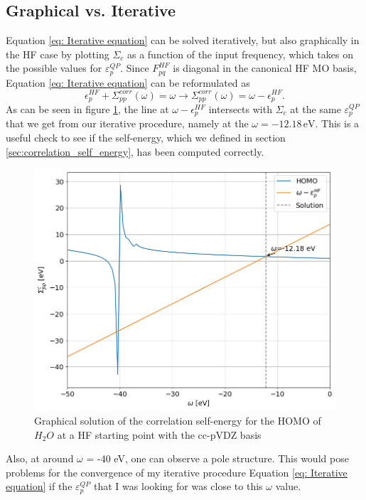 \documentclass[12pt]{caltech_thesis}
\begin{document}
\subsection{Graphical vs. Iterative}
Equation \ref{eq: Iterative equation} can be solved iteratively, but also graphically in the HF case by plotting $\Sigma _{c}$ as a function of the input frequency, which takes on  the possible values for $\varepsilon_{p}^{QP}$. Since $F_{pq}^{HF}$ is diagonal in the canonical HF MO basis, Equation \ref{eq: Iterative equation} can be reformulated as
\begin{equation}
    \epsilon _{p}^{HF} + \Sigma_{pp}^{corr}(\omega) = \omega  \rightarrow \Sigma_{pp}^{corr}(\omega) = \omega  - \epsilon _{p}^{HF}.
\end{equation}
As can be seen in figure \ref{fig:graphic}, the line at $\omega - \epsilon_{p}^{HF}$ intersects with $\Sigma _{c}$ at the same $\varepsilon_{p}^{QP}$ that we get from our iterative procedure, namely at the $\omega = -12.18 \, \mathrm{eV}$.
 This is a useful check to see if the self-energy, which we defined in section \ref{sec:correlation_self_energy}, has been computed correctly.
\begin{figure}[h]
    \centering
    \includegraphics[width=\textwidth]{correlation_energies.png}
\caption{Graphical solution of the correlation self-energy for the HOMO of $H_2O$ at a HF starting point with the cc-pVDZ basis}
\label{fig:graphic}
\end{figure}
Also, at around $\omega$ = -40 eV, one can observe a pole structure. This would pose problems for the convergence of my iterative procedure Equation \ref{eq: Iterative equation} if the $\varepsilon_{p}^{QP}$ that I was looking for was close to this $\omega $ value. 
\end{document}
